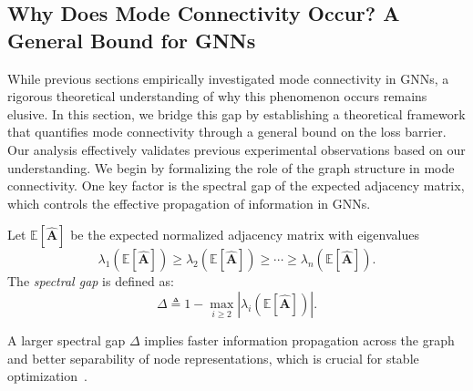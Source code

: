 

\subsection{Why Does Mode Connectivity Occur? A General Bound for GNNs}
\label{sec:theory}

While previous sections empirically investigated mode connectivity in GNNs, a rigorous theoretical understanding of why this phenomenon occurs remains elusive. In this section, we bridge this gap by establishing a theoretical framework that quantifies mode connectivity through a general bound on the loss barrier. 
Our analysis effectively validates previous experimental observations based on our understanding. We begin by formalizing the role of the graph structure in mode connectivity. One key factor is the spectral gap of the expected adjacency matrix, which controls the effective propagation of information in GNNs.
\begin{definition}
\label{def:spectral-gap}
Let \(\mathbb{E}[\hat{\mathbf{A}}]\) be the expected normalized adjacency matrix with eigenvalues
\[
\lambda_1(\mathbb{E}[\hat{\mathbf{A}}]) \ge \lambda_2(\mathbb{E}[\hat{\mathbf{A}}]) \ge \cdots \ge \lambda_n(\mathbb{E}[\hat{\mathbf{A}}]).
\]
The \emph{spectral gap} is defined as:
\[
\Delta \triangleq 1 - \max_{i\ge 2} |\lambda_i(\mathbb{E}[\hat{\mathbf{A}}])|.
\]
\end{definition}
 A larger spectral gap \(\Delta\) implies faster information propagation across the graph and better separability of node representations, which is crucial for stable optimization~\cite{chung1997spectral,abbe2018community}.

